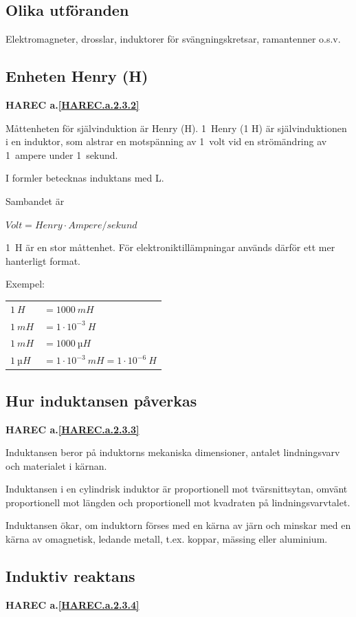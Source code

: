 \subsection{Olika utföranden}

Elektromagneter, drosslar, induktorer för svängningskretsar, ramantenner o.s.v.

\subsection{Enheten Henry (H)}
\textbf{HAREC a.\ref{HAREC.a.2.3.2}\label{myHAREC.a.2.3.2}}

Måttenheten för självinduktion är Henry (H). 1~Henry (1 H) är självinduktionen i
en induktor, som alstrar en motspänning av 1~volt vid en strömändring av
1~ampere under 1~sekund.

I formler betecknas induktans med L.

Sambandet är

\(Volt = Henry \cdot Ampere/sekund\)

1~H är en stor måttenhet. För elektroniktillämpningar används därför ett mer
hanterligt format.

Exempel:

\begin{tabular}{ll}
\(1\ H \) & \(= 1000\ mH\) \\
\(1\ mH\) & \(= 1 \cdot 10^{-3}\ H\) \\
\(1\ mH\) & \(= 1000\ µH\) \\
\(1\ µH\) & \(= 1 \cdot 10^{-3}\ mH = 1 \cdot 10^{-6}\ H \)
\end{tabular}

\subsection{Hur induktansen påverkas}
\textbf{HAREC a.\ref{HAREC.a.2.3.3}\label{myHAREC.a.2.3.3}}

Induktansen beror på induktorns mekaniska dimensioner, antalet lindningsvarv och
materialet i kärnan.

Induktansen i en cylindrisk induktor är proportionell mot tvärsnittsytan, omvänt
proportionell mot längden och proportionell mot kvadraten på lindningsvarvtalet.

Induktansen ökar, om induktorn förses med en kärna av järn och minskar med en
kärna av omagnetisk, ledande metall, t.ex. koppar, mässing eller aluminium.

\subsection{Induktiv reaktans}
\textbf{HAREC a.\ref{HAREC.a.2.3.4}\label{myHAREC.a.2.3.4}}

